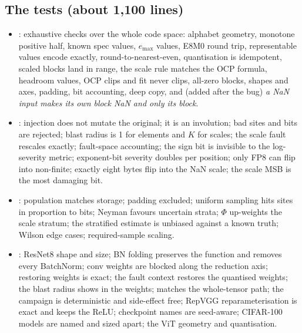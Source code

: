 \subsection{The tests (about 1{,}100 lines)}
\begin{itemize}
\item {}: exhaustive checks over the whole code space: alphabet geometry, monotone positive half, known spec values, $e_{\max}$ values, E8M0 round trip, representable values encode exactly, round-to-nearest-even, quantisation is idempotent, scaled blocks land in range, the scale rule matches the OCP formula, headroom values, OCP clips and fit never clips, all-zero blocks,
 shapes and axes, padding, bit accounting, deep copy, and (added after the bug) \emph{a NaN input makes its own block NaN and only its block}.
\item {}: injection does not mutate the original; it is an involution; bad sites and bits are rejected; blast radius is 1 for elements and $K$ for scales; the scale fault rescales exactly; fault-space accounting; the sign bit is invisible to the log-severity metric; exponent-bit severity doubles per position; only FP8 can flip into non-finite; exactly eight bytes flip into the NaN scale; the scale MSB is the most damaging bit.
\item {}: population matches storage; padding excluded; uniform sampling hits sites in proportion to bits; Neyman favours uncertain strata; $\Phi$ up-weights the scale stratum; the stratified estimate is unbiased against a known truth; Wilson edge cases; required-sample scaling.
\item {}: ResNet8 shape and size; BN folding preserves the function and removes every BatchNorm; conv weights are blocked along the reduction axis; restoring weights is exact; the fault context restores the quantised weights; the blast radius shows in the weights;  matches the whole-tensor path; the campaign is deterministic and side-effect free;
 RepVGG reparameterisation is exact and keeps the ReLU; checkpoint names are seed-aware; CIFAR-100 models are named and sized apart; the ViT geometry and quantisation.
\end{itemize}


